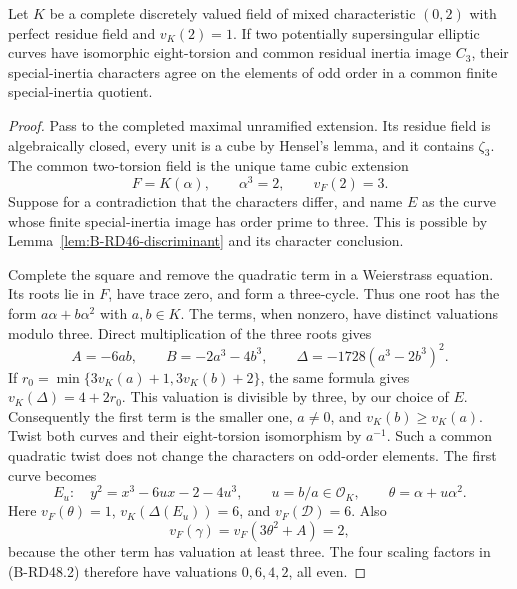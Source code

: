 \begin{proposition}
\label{prop:B-RD48}
Let $K$ be a complete discretely valued field of mixed
characteristic $(0,2)$ with perfect residue field and $v_K(2)=1$.
If two potentially supersingular elliptic curves have
isomorphic eight-torsion and common residual inertia image
$C_3$, their special-inertia characters agree on the elements
of odd order in a common finite special-inertia quotient.
\end{proposition}
\begin{proof}
Pass to the completed maximal unramified extension.
Its residue field is algebraically closed, every unit is a cube
by Hensel's lemma, and it contains $\zeta_3$.
The common two-torsion field is the unique tame cubic extension
\[
                   F=K(\alpha),\qquad \alpha^3=2,
                   \qquad v_F(2)=3.
\]
Suppose for a contradiction that the characters differ, and
name $E$ as the curve whose finite special-inertia image has
order prime to three. This is possible by
Lemma~\ref{lem:B-RD46-discriminant} and its character conclusion.

Complete the square and remove the quadratic term in a
Weierstrass equation. Its roots lie in $F$, have trace zero,
and form a three-cycle. Thus one root has the form
$a\alpha+b\alpha^2$ with $a,b\in K$.
The terms, when nonzero, have distinct valuations modulo three.
Direct multiplication of the three roots gives
\[
 A=-6ab,\qquad B=-2a^3-4b^3,\qquad
 \Delta=-1728(a^3-2b^3)^2.                             \tag{B-RD48.6}
\]
If $r_0=\min\{3v_K(a)+1,3v_K(b)+2\}$, the same formula gives
$v_K(\Delta)=4+2r_0$.
This valuation is divisible by three, by our choice of $E$.
Consequently the first term is the smaller one, $a\ne0$,
and $v_K(b)\ge v_K(a)$.
Twist both curves and their eight-torsion isomorphism by
$a^{-1}$. Such a common quadratic twist does not change the
characters on odd-order elements. The first curve becomes
\[
 E_u:\quad y^2=x^3-6u x-2-4u^3,
 \qquad u=b/a\in\mathcal O_K,
 \qquad \theta=\alpha+u\alpha^2.                       \tag{B-RD48.7}
\]
Here $v_F(\theta)=1$, $v_K(\Delta(E_u))=6$, and
$v_F(\mathcal D)=6$. Also
\[
             v_F(\gamma)=v_F(3\theta^2+A)=2,
\]
because the other term has valuation at least three.
The four scaling factors in (B-RD48.2) therefore have
valuations $0,6,4,2$, all even.


\end{proof}
